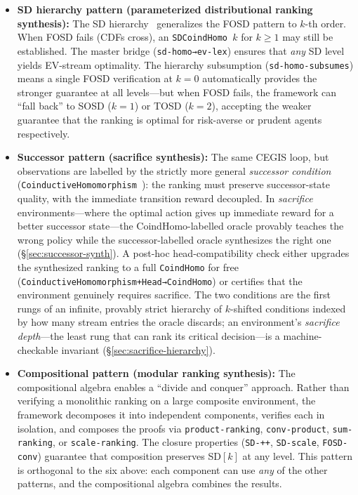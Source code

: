 \documentclass[9pt,a4paper]{article}
\theoremstyle{plain}
\theoremstyle{definition}
\theoremstyle{remark}
\begin{document}
\begin{itemize}
\item \textbf{SD hierarchy pattern (parameterized distributional ranking synthesis):} The SD hierarchy~\cite{CSHRLSuccessor} generalizes the FOSD pattern to $k$-th order.  When FOSD fails (CDFs cross), an \texttt{SDCoindHomo~$k$} for $k \ge 1$ may still be established.  The master bridge (\texttt{sd-homo→ev-lex}) ensures that \emph{any} SD level yields EV-stream optimality.  The hierarchy subsumption (\texttt{sd-homo-subsumes}) means a single FOSD verification at $k{=}0$ automatically provides the stronger guarantee at all levels---but when FOSD fails, the framework can ``fall back'' to SOSD ($k{=}1$) or TOSD ($k{=}2$), accepting the weaker guarantee that the ranking is optimal for risk-averse or prudent agents respectively.

\item \textbf{Successor pattern (sacrifice synthesis):} The same CEGIS loop, but observations are labelled by the strictly more general \emph{successor condition} (\texttt{CoinductiveHomomorphism}~\cite{CSHRLSuccessor}): the ranking must preserve successor-state quality, with the immediate transition reward decoupled.  In \emph{sacrifice} environments---where the optimal action gives up immediate reward for a better successor state---the CoindHomo-labelled oracle provably teaches the wrong policy while the successor-labelled oracle synthesizes the right one (\S\ref{sec:successor-synth}).  A post-hoc head-compatibility check either upgrades the synthesized ranking to a full \texttt{CoindHomo} for free (\texttt{CoinductiveHomomorphism+Head→CoindHomo}) or certifies that the environment genuinely requires sacrifice.  The two conditions are the first rungs of an infinite, provably strict hierarchy of $k$-shifted conditions indexed by how many stream entries the oracle discards; an environment's \emph{sacrifice depth}---the least rung that can rank its critical decision---is a machine-checkable invariant (\S\ref{sec:sacrifice-hierarchy}).

\item \textbf{Compositional pattern (modular ranking synthesis):} The compositional algebra enables a ``divide and conquer'' approach.  Rather than verifying a monolithic ranking on a large composite environment, the framework decomposes it into independent components, verifies each in isolation, and composes the proofs via \texttt{product-ranking}, \texttt{conv-product}, \texttt{sum-ranking}, or \texttt{scale-ranking}.  The closure properties (\texttt{SD-++}, \texttt{SD-scale}, \texttt{FOSD-conv}) guarantee that composition preserves SD$[k]$ at any level.  This pattern is orthogonal to the six above: each component can use \emph{any} of the other patterns, and the compositional algebra combines the results.
\end{itemize}
\end{document}
